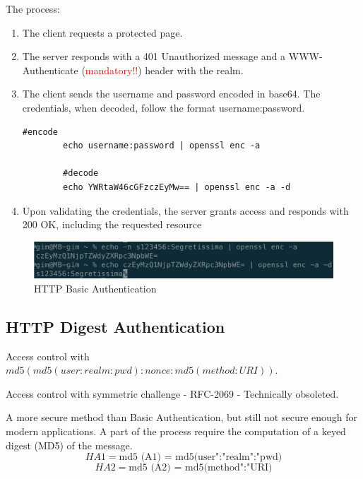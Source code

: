 The process:
\begin{enumerate}
    \item The client requests a protected page.
    \item The server responds with a 401 Unauthorized message and a WWW-Authenticate (\textcolor{Red}{mandatory!!}) header with the realm.
    \item The client sends the username and password encoded in base64. The credentials, when decoded, follow the format username:password.
    \begin{lstlisting}[style=bashStyle]
        #encode
        echo username:password | openssl enc -a 

        #decode
        echo YWRtaW46cGFzczEyMw== | openssl enc -a -d
    \end{lstlisting}
    \item Upon validating the credentials, the server grants access and responds with 200 OK, including the requested resource
\end{enumerate}

\begin{figure}[H]
    \centering
    \includegraphics[width=0.6\linewidth]{Images/Appsec/basic_authN.png}
    \caption{HTTP Basic Authentication}
\end{figure}

\clearpage

\subsection{HTTP Digest Authentication}
\begin{center}
    Access control with $md5(md5(user:realm:pwd):nonce:md5(method:URI))$.
\end{center}
\begin{center}
    Access control with symmetric challenge - RFC-2069 - Technically obsoleted.
\end{center}
A more secure method than Basic Authentication, but still not secure enough for modern applications. A part of the process require the computation of a keyed digest (MD5) of the message.
\[
    HA1 = \text{md5 (A1) = md5(user":"realm":"pwd)}
\]
\[
    HA2 = \text{md5 (A2) = md5(method":"URI)}
\]

\vspace{0.3cm}

